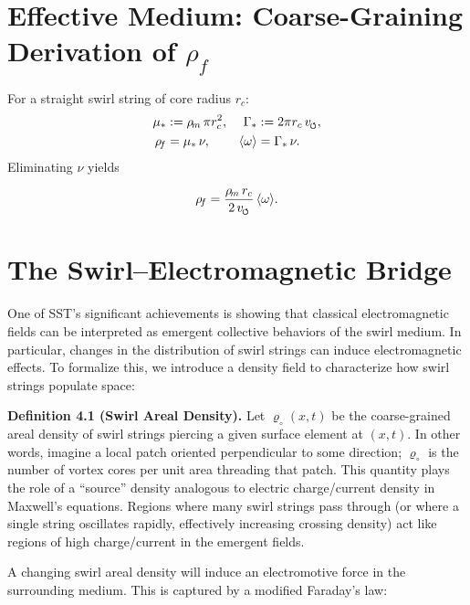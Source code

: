 \documentclass[reprint,aps,onecolumn,nofootinbib]{revtex4-2}
\newcommand{\swirlarrow}{%
    \mathchoice{\mkern-2mu\scriptstyle\boldsymbol{\circlearrowleft}}%
    {\mkern-2mu\scriptstyle\boldsymbol{\circlearrowleft}}%
    {\mkern-2mu\scriptscriptstyle\boldsymbol{\circlearrowleft}}%
    {\mkern-2mu\scriptscriptstyle\boldsymbol{\circlearrowleft}}%
}
\newcommand{\vscore}{v_{\swirlarrow}}                    %
\newcommand{\rhof}{\rho_{\!f}}                           %
\newcommand{\rhom}{\rho_{\!m}}                           %
\newcommand{\rc}{r_c}                                    %
\providecommand{\rc}{r_c}
\begin{document}
    \section{Effective Medium: Coarse-Graining Derivation of $\rhof$}\label{canon58:rho_f}
    For a straight swirl string of core radius $\rc$:
    \begin{align}
    \mu_* &:= \rhom\,\pi \rc^2, & \Gamma_* &:= 2\pi \rc\,\vscore,\\
    \rhof &= \mu_*\,\nu, & \langle \omega \rangle &= \Gamma_*\,\nu.
    \end{align}
    Eliminating $\nu$ yields
    \begin{tcolorbox}[title=Boxed Result]
    \label{canon58:box-rhof}
    \[
        \rhof = \frac{\rhom\,\rc}{2\,\vscore}\,\langle \omega \rangle.
    \]
    \end{tcolorbox}




	\section{The Swirl–Electromagnetic Bridge}
	One of SST’s significant achievements is showing that classical electromagnetic fields can be interpreted as emergent collective behaviors of the swirl medium. In particular, changes in the distribution of swirl strings can induce electromagnetic effects. To formalize this, we introduce a density field to characterize how swirl strings populate space:

	\textbf{Definition 4.1 (Swirl Areal Density).} Let $\varrho_{\circ}(x,t)$ be the coarse-grained areal density of swirl strings piercing a given surface element at $(x,t)$. In other words, imagine a local patch oriented perpendicular to some direction; $\varrho_{\circ}$ is the number of vortex cores per unit area threading that patch. This quantity plays the role of a “source” density analogous to electric charge/current density in Maxwell’s equations. Regions where many swirl strings pass through (or where a single string oscillates rapidly, effectively increasing crossing density) act like regions of high charge/current in the emergent fields.

	A changing swirl areal density will induce an electromotive force in the surrounding medium. This is captured by a modified Faraday’s law:
\end{document}
